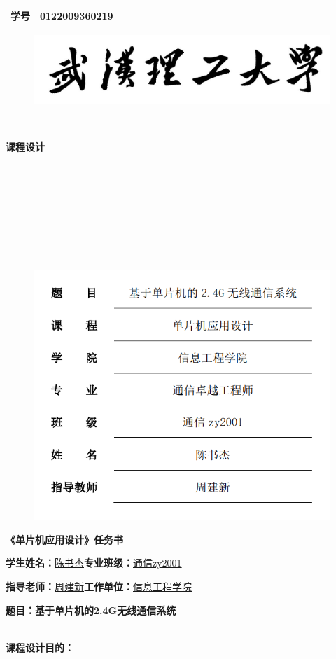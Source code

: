 \documentclass[UTF8,a4paper,11pt]{article}
\begin{document}
\begin{tabular}{|c|r|}
    \hline
    学号 & 0122009360219 \\ 
    \hline
\end{tabular}
\newline
\newline

\begin{figure}[htbp]
    \centering
    \includegraphics{sc.jpg}
\end{figure} 
~\\
\centerline{\Huge\textbf{课\quad 程\quad 设\quad 计}}

~\\
~\\
~\\
~\\
~\\
~\\
~\\
\begin{figure}[htbp]
    \centering
    \includegraphics[scale=0.9]{2.png}
\end{figure} 
\thispagestyle{empty}
\clearpage

\centerline{\LARGE\textbf{《单片机应用设计》任务书}}
\begin{center}
\large{
\textbf{学生姓名：}\underline{陈书杰}\quad\textbf{专业班级：}\underline{通信zy2001}

\textbf{指导老师：}\underline{周建新}\quad\textbf{工作单位：}\underline{信息工程学院}

\textbf{题目：基于单片机的2.4G无线通信系统}
}
\end{center}
~\\
\large{\textbf{课程设计目的：}}\normalsize
\end{document}
